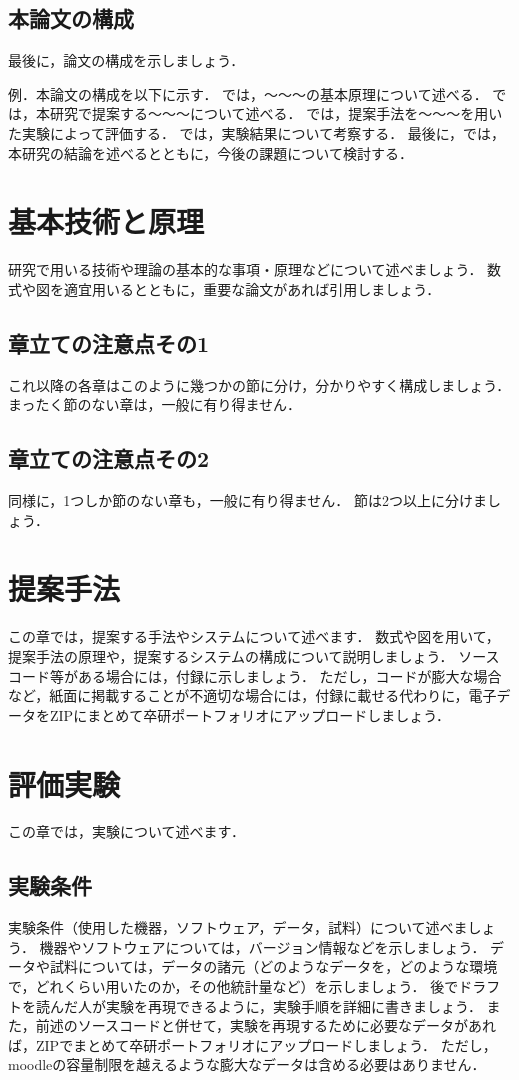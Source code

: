 \documentclass[uplatex,draft]{ipsjpapers}
\begin{document}
 \subsection{本論文の構成}
   最後に，論文の構成を示しましょう．
   \par
   例．本論文の構成を以下に示す．
   \label{sec:fundamental}では，～～～の基本原理について述べる．
   \label{sec:proposed}では，本研究で提案する～～～について述べる．
   \label{sec:experiment}では，提案手法を～～～を用いた実験によって評価する．
   \label{sec:discussion}では，実験結果について考察する．
   最後に，\label{sec:conclusion}では，本研究の結論を述べるとともに，今後の課題について検討する．
\section{基本技術と原理}
 \label{sec:fundamental}
 研究で用いる技術や理論の基本的な事項・原理などについて述べましょう．
 数式や図を適宜用いるとともに，重要な論文があれば引用しましょう．
 \subsection{章立ての注意点その1}
   これ以降の各章はこのように幾つかの節に分け，分かりやすく構成しましょう．
   まったく節のない章は，一般に有り得ません．
 \subsection{章立ての注意点その2}
   同様に，1つしか節のない章も，一般に有り得ません．
   節は2つ以上に分けましょう．
\section{提案手法}
 \label{sec:proposed}
 この章では，提案する手法やシステムについて述べます．
 数式や図を用いて，提案手法の原理や，提案するシステムの構成について説明しましょう．
 ソースコード等がある場合には，付録に示しましょう．
 ただし，コードが膨大な場合など，紙面に掲載することが不適切な場合には，付録に載せる代わりに，電子データをZIPにまとめて卒研ポートフォリオにアップロードしましょう．
\section{評価実験}
 \label{sec:experiment}
 この章では，実験について述べます．
 \subsection{実験条件}
   実験条件（使用した機器，ソフトウェア，データ，試料）について述べましょう．
   機器やソフトウェアについては，バージョン情報などを示しましょう．
   データや試料については，データの諸元（どのようなデータを，どのような環境で，どれくらい用いたのか，その他統計量など）を示しましょう．
   後でドラフトを読んだ人が実験を再現できるように，実験手順を詳細に書きましょう．
   また，前述のソースコードと併せて，実験を再現するために必要なデータがあれば，ZIPでまとめて卒研ポートフォリオにアップロードしましょう．
   ただし，moodleの容量制限を越えるような膨大なデータは含める必要はありません．
\end{document}
